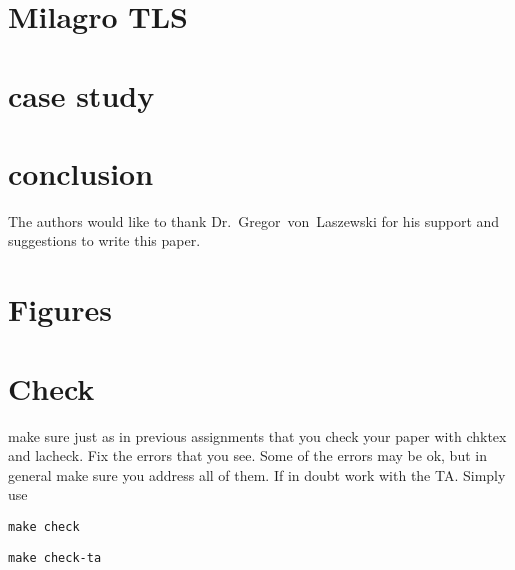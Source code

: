 \section{Milagro TLS}

\section{case study} %
\section{conclusion}

\begin{acks}

  The authors would like to thank Dr.~Gregor~von~Laszewski for his
  support and suggestions to write this paper.

\end{acks}


\section{Figures}



\section{Check}

make sure just as in previous assignments that you check your paper
with chktex and lacheck. Fix the errors that you see. Some of the
errors may be ok, but in general make sure you address all of them. If
in doubt work with the TA. Simply use

\begin{verbatim}
make check
\end{verbatim}

\begin{verbatim}
make check-ta
\end{verbatim}


 
